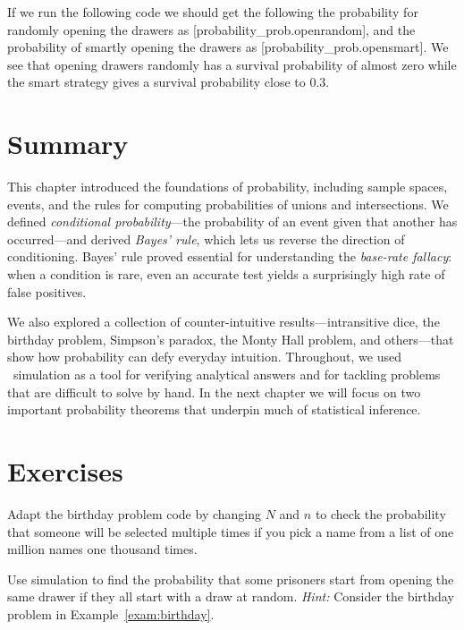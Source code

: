 If we run the following code
\noindent we should get the following the probability for randomly opening the
drawers as [probability_prob.openrandom], and
the probability of smartly opening the drawers as
[probability_prob.opensmart]. 
We see that opening drawers randomly has a survival probability of almost zero
while the smart strategy gives a survival probability close to 0.3.


\section{Summary}
This chapter introduced the foundations of probability, including sample spaces,
events, and the rules for computing probabilities of unions and intersections.
We defined \emph{conditional probability}---the probability of an event given
that another has occurred---and derived \emph{Bayes' rule}, which lets us
reverse the direction of conditioning. Bayes' rule proved essential for
understanding the \emph{base-rate fallacy}: when a condition is rare,
even an accurate test yields a surprisingly high rate of false positives.

We also explored a collection of counter-intuitive results---intransitive dice,
the birthday problem, Simpson's paradox, the Monty Hall problem, and
others---that show how probability can defy everyday intuition.
Throughout, we used \R\ simulation as a tool for verifying analytical answers
and for tackling problems that are difficult to solve by hand.
In the next chapter we will focus on two important probability theorems that
underpin much of statistical inference.

\section{Exercises}

\begin{exercise}
Adapt the birthday problem code by changing $N$ and $n$ to check the
probability that someone will be selected multiple times if you pick a name
from a list of one million names one thousand times.
\end{exercise}

\begin{exercise}
Use simulation to find the probability that some prisoners start from opening
the same drawer if they all start with a draw at random.
\emph{Hint:} Consider the birthday problem in Example~\ref{exam:birthday}.
\end{exercise}

